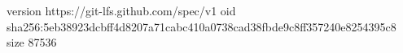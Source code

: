 version https://git-lfs.github.com/spec/v1
oid sha256:5eb38923dcbff4d8207a71cabc410a0738cad38fbde9c8ff357240e8254395c8
size 87536
